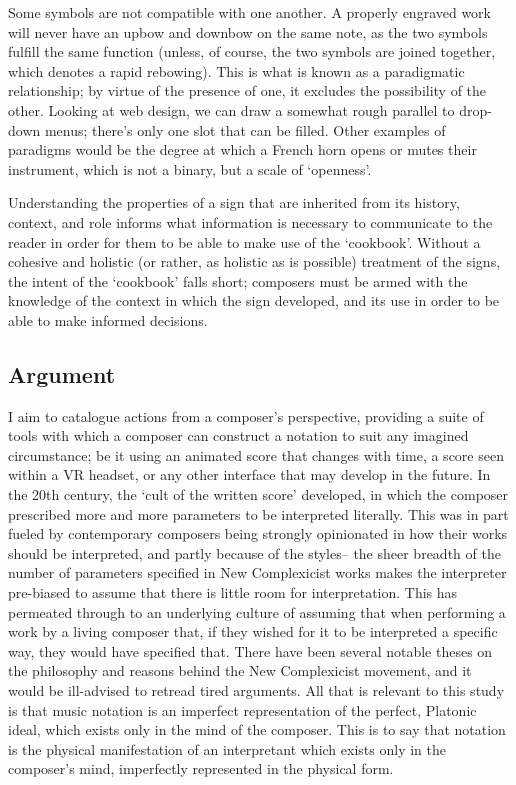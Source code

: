 Some symbols are not compatible with one another. 
A properly engraved work will never have an upbow and downbow on the same note, as the two symbols fulfill the same function (unless, of course, the two symbols are joined together, which denotes a rapid rebowing).
This is what is known as a paradigmatic relationship; by virtue of the presence of one, it excludes the possibility of the other.
Looking at web design, we can draw a somewhat rough parallel to drop-down menus; there's only one slot that can be filled.
Other examples of paradigms would be the degree at which a French horn opens or mutes their instrument, which is not a binary, but a scale of `openness'.

Understanding the properties of a sign that are inherited from its history, context, and role informs what information is necessary to communicate to the reader in order for them to be able to make use of the `cookbook'.
Without a cohesive and holistic (or rather, as holistic as is possible) treatment of the signs, the intent of the `cookbook' falls short; composers must be armed with the knowledge of the context in which the sign developed, and its use in order to be able to make informed decisions.



\subsection{Argument}
I aim to catalogue actions from a composer's perspective, providing a suite of tools with which a composer can construct a notation to suit any imagined circumstance; be it using an animated score that changes with time, a score seen within a VR headset, or any other interface that may develop in the future.
In the 20th century, the `cult of the written score' developed, in which the composer prescribed more and more parameters to be interpreted literally.
This was in part fueled by contemporary composers being strongly opinionated in how their works should be interpreted, and partly because of the styles-- the sheer breadth of the number of parameters specified in New Complexicist works makes the interpreter pre-biased to assume that there is little room for interpretation.
This has permeated through to an underlying culture of assuming that when performing a work by a living composer that, if they wished for it to be interpreted a specific way, they would have specified that.
There have been several notable theses on the philosophy and reasons behind the New Complexicist movement, and it would be ill-advised to retread tired arguments.
All that is relevant to this study is that music notation is an imperfect representation of the perfect, Platonic ideal, which exists only in the mind of the composer. 
This is to say that notation is the physical manifestation of an interpretant which exists only in the composer's mind, imperfectly represented in the physical form.

